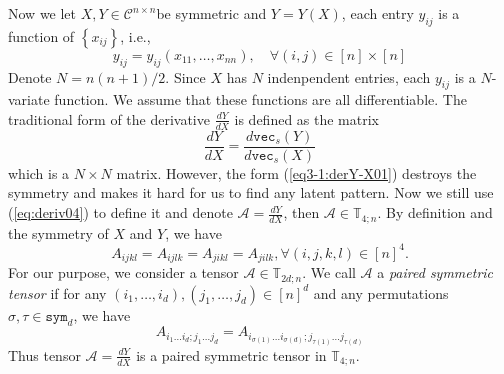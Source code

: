 \documentclass[11pt, oneside]{article}  %
\newcommand{\set}[1]{\left\{#1\right\}}
\newcommand{\Sym}{\texttt{sym}}
\newcommand{\vecc}{\texttt{vec}}
\newcommand{\si}{\sigma}
\newcommand{\TT}{\mathbb{T}}
\newcommand{\A}{\mathcal{A}}
\newcommand{\C}{\mathcal{C}}
\newcommand{\beq}{\begin{equation}}
\newcommand{\eeq}{\end{equation}}
\begin{document}
Now we let $X,Y\in\C^{n\times n}$be symmetric and $Y=Y(X)$, each entry $y_{ij}$ is a function of $\set{x_{ij}}$, i.e., 
\[  y_{ij}=y_{ij}(x_{11},\ldots,x_{nn}), \quad  \forall (i,j)\in [n]\times [n]  \]
Denote $N=n(n+1)/2$.  Since $X$ has $N$ indenpendent entries,  each $y_{ij}$ is a $N$-variate function.  We assume that these functions are all 
differentiable.  The traditional form of the derivative $\frac{d Y}{dX}$ is defined as the matrix 
\beq\label{eq3-1:derY-X01}
\frac{d Y}{dX} = \frac{d \vecc_{s}(Y)}{d\vecc_{s}(X)}
\eeq
which is a $N\times N$ matrix. However, the form (\ref{eq3-1:derY-X01}) destroys the symmetry and makes it hard for us to find any latent pattern.  
Now we still use (\ref{eq:deriv04}) to define it and denote $\A=\frac{d Y}{dX}$, then $\A\in\TT_{4;n}$.  By definition and the symmetry of $X$ and $Y$, 
we have 
\[  A_{ijkl} = A_{ijlk} = A_{jikl} = A_{jilk},  \forall (i,j,k,l)\in [n]^{4}. \]
For our purpose, we consider a tensor $\A\in\TT_{2d;n}$.  We call $\A$ a \emph{paired symmetric tensor} if  for any 
$(i_{1},\ldots,i_{d}), (j_{1},\ldots,j_{d})\in [n]^{d}$ and any permutations $\si,\tau\in\Sym_{d}$, we have 
\beq\label{eq3-0:pair-sym-t}
A_{i_1\ldots i_d; j_1\ldots j_d} = A_{i_{\si(1)}\ldots i_{\si(d)}; j_{\tau(1)}\ldots j_{\tau(d)}}
\eeq 
Thus tensor $\A=\frac{d Y}{dX}$ is a paired symmetric tensor in $\TT_{4;n}$.  
\end{document}
